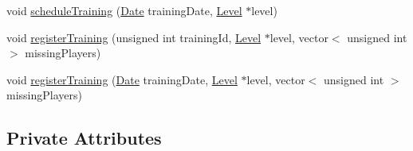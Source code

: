 \begin{DoxyCompactItemize}
\item 
void \hyperlink{class_club_aaa8b24f7bbc9fc3cb114b9dd4ee65af3}{schedule\+Training} (\hyperlink{class_date}{Date} training\+Date, \hyperlink{class_level}{Level} $\ast$level)
\item 
void \hyperlink{class_club_ab980545f4b4236481268705d9d965f13}{register\+Training} (unsigned int training\+Id, \hyperlink{class_level}{Level} $\ast$level, vector$<$ unsigned int $>$ missing\+Players)
\item 
void \hyperlink{class_club_a0085b30f629ff1ca45090738ecaba5b7}{register\+Training} (\hyperlink{class_date}{Date} training\+Date, \hyperlink{class_level}{Level} $\ast$level, vector$<$ unsigned int $>$ missing\+Players)
\end{DoxyCompactItemize}
\subsection*{Private Attributes}
